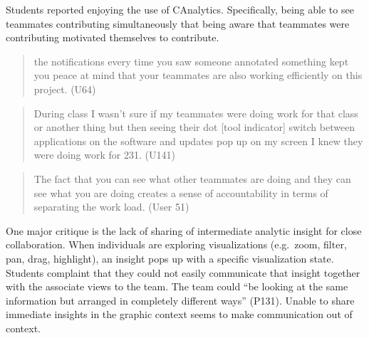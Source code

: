 \documentclass[]{article}
\begin{document}
Students reported enjoying the use of CAnalytics. Specifically, being
able to see teammates contributing simultaneously that being aware that
teammates were contributing motivated themselves to contribute.

\begin{quote}
the notifications every time you saw someone annotated something kept
you peace at mind that your teammates are also working efficiently on
this project. (U64)
\end{quote}

\begin{quote}
During class I wasn't sure if my teammates were doing work for that
class or another thing but then seeing their dot {[}tool indicator{]}
switch between applications on the software and updates pop up on my
screen I knew they were doing work for 231. (U141)
\end{quote}

\begin{quote}
The fact that you can see what other teammates are doing and they can
see what you are doing creates a sense of accountability in terms of
separating the work load. (User 51)
\end{quote}

One major critique is the lack of sharing of intermediate analytic
insight for close collaboration. When individuals are exploring
visualizations (e.g.~zoom, filter, pan, drag, highlight), an insight
pops up with a specific visualization state. Students complaint that
they could not easily communicate that insight together with the
associate views to the team. The team could ``be looking at the same
information but arranged in completely different ways'' (P131). Unable
to share immediate insights in the graphic context seems to make
communication out of context.

\printbibliography
\end{document}
